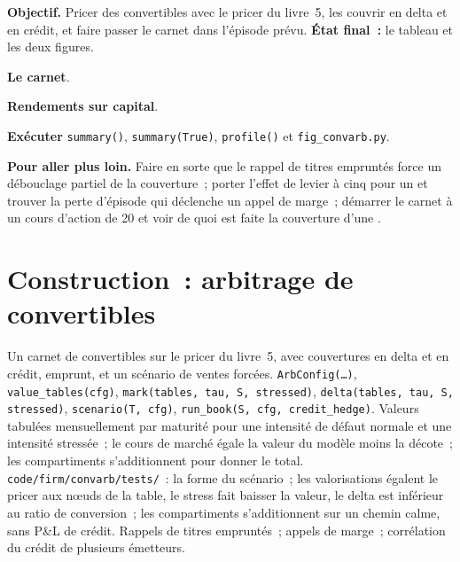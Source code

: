 \begin{tutorial}
\textbf{Objectif.} Pricer des convertibles avec le pricer du livre~5, les couvrir en delta et en crédit, et faire passer le carnet dans l'épisode prévu.
\textbf{État final~:} le tableau et les deux figures.
\begin{tutsteps}
\item \textbf{Le carnet}.
\label{lst:s2:convertible-arbitrage:book}
\item \textbf{Rendements sur capital}.
\label{lst:s2:convertible-arbitrage:summary}
\item \textbf{Exécuter} \texttt{summary()}, \texttt{summary(True)}, \texttt{profile()} et \texttt{fig\_convarb.py}.
\end{tutsteps}
\textbf{Pour aller plus loin.} Faire en sorte que le rappel de titres empruntés force un débouclage partiel de la couverture~; porter l'effet de levier à cinq pour un et trouver la perte d'épisode qui
déclenche un appel de marge~; démarrer le carnet à un cours d'action de 20 et voir de quoi est faite la couverture d'une .
\end{tutorial}

\section{Construction~: arbitrage de convertibles}\label{bld:s2:convertible-arbitrage:convarb}

\begin{build}
 Un carnet de convertibles sur le pricer du livre~5, avec couvertures en delta et en crédit, emprunt, et un scénario de ventes forcées.
 \texttt{ArbConfig(\dots)}, \texttt{value\_tables(cfg)}, \texttt{mark(tables, tau, S, stressed)},
\texttt{delta(tables, tau, S, stressed)}, \texttt{scenario(T, cfg)}, \texttt{run\_book(S, cfg, credit\_hedge)}.
 Valeurs tabulées mensuellement par maturité pour une intensité de défaut normale et une intensité stressée~; le cours de marché égale la valeur du modèle moins la décote~; les compartiments
s'additionnent pour donner le total.
 \texttt{code/firm/convarb/tests/}~: la forme du scénario~; les valorisations égalent le pricer aux nœuds de la table, le stress fait baisser la valeur,
le delta est inférieur au ratio de conversion~; les compartiments s'additionnent sur un chemin calme, sans P\&L de crédit.
 Rappels de titres empruntés~; appels de marge~; corrélation du crédit de plusieurs émetteurs.
\end{build}

